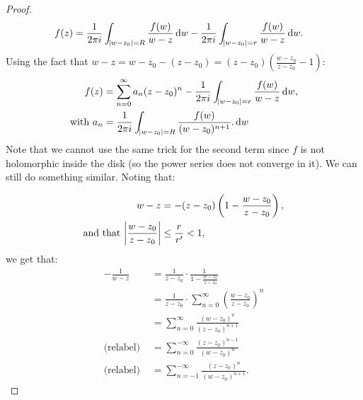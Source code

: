 \begin{proof}
\begin{align*}
    f(z) &= \frac{1}{2 \pi i} \int_{\abs{w- z_0} = R} \frac{f(w)}{w-z} \dif w - \frac{1}{2 \pi i} \int_{\abs{w- z_0} = r} \frac{f(w)}{w-z} \dif w.
\end{align*}
Using the fact that $w-z = w-z_0 -(z-z_0) = (z-z_0) \left( \frac{w-z_0}{z-z_0} -1 \right)$:
\begin{align*}
    f(z) &= \sum_{n=0}^\infty a_n (z-z_0)^n - \frac{1}{2 \pi i} \int_{\abs{w- z_0} = r} \frac{f(w)}{w-z} \dif w,\\
    \text{with } a_n &= \frac{1}{2 \pi i} \int_{\abs{w- z_0} = R} \frac{f(w)}{(w-z_0)^{n+1}}. \dif w
\end{align*}
Note that we cannot use the same trick for the second term since $f$ is not holomorphic inside the disk (so the power series does not converge in it). We can still do something similar. Noting that:


\begin{center}
\end{center}


\begin{align*}
    w-z &= - (z-z_0) \left(   1-  \frac{w-z_0}{z-z_0} \right),\\
\text{and that } \abs{\frac{w-z_0}{z-z_0}} &\leq \frac{r}{r'} < 1,
\end{align*}
we get that:
\begin{align*}
    -\frac{1}{w-z} &= \frac{1}{z-z_0} \cdot \frac{1}{1-\frac{w-z_0}{z-z_0}}\\ &= \frac{1}{z-z_0} \cdot \sum_{n=0}^\infty \left( \frac{w-z_0}{z-z_0} \right)^n\\
    &= \sum_{n=0}^\infty \frac{(w-z_0)^n}{(z-z_0)^{n+1}}\\
    \text{(relabel) } &= \sum_{n=0}^{-\infty} \frac{(z-z_0)^{n-1}}{(w-z_0)^n}\\
    \text{(relabel) } &= \sum_{n=-1}^{-\infty} \frac{(z-z_0)^{n}}{(w-z_0)^{n+1}}.
\end{align*}


\end{proof}
